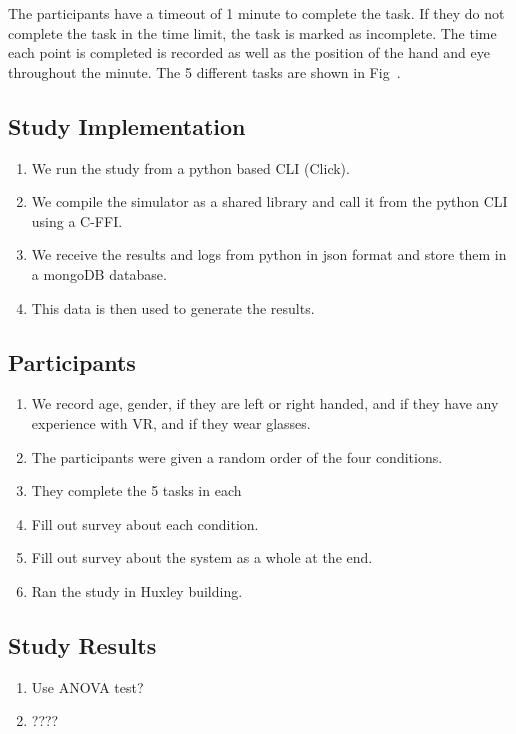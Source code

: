 The participants have a timeout of 1 minute to complete the task. If they do not complete the task in the time limit, the task is marked as incomplete. The time each point is completed is recorded as well as the position of the hand and eye throughout the minute. The 5 different tasks are shown in Fig~\todo.

\subsection{Study Implementation}
\begin{enumerate}
	\item We run the study from a python based CLI (Click).
	\item We compile the simulator as a shared library and call it from the python CLI using a C-FFI.
	\item We receive the results and logs from python in json format and store them in a mongoDB database.
	\item This data is then used to generate the results.
\end{enumerate}

\subsection{Participants}
\begin{enumerate}
	\item We record age, gender, if they are left or right handed, and if they have any experience with VR, and if they wear glasses.
	\item The participants were given a random order of the four conditions.
	\item They complete the 5 tasks in each
	\item Fill out survey about each condition.
	\item Fill out survey about the system as a whole at the end.
	\item Ran the study in Huxley building.
\end{enumerate}

\subsection{Study Results}
\begin{enumerate}
	\item Use ANOVA test?
	\item ????
\end{enumerate}

